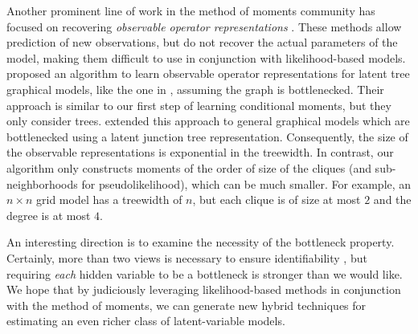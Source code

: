 
Another prominent line of work in the method of moments community has
  focused on recovering {\em observable operator
  representations} \citep{jaeger2000observable,hsu09spectral,bailly2010spectral,balle12automata}.
  These methods allow prediction of new observations, but do not
  recover the actual parameters of the model, making them difficult to use
  in conjunction with likelihood-based models. %
\citet{song2011spectral} proposed an algorithm to learn observable
  operator representations for latent tree graphical models, like the
  one in , assuming the graph is bottlenecked. 
Their approach is similar to our first step of learning conditional moments,
  but they only consider trees.
\citet{parikh12spectral} extended this approach to general graphical
  models which are bottlenecked using a latent junction tree representation. 
  Consequently, the size of the observable representations is exponential in
  the treewidth.
  In contrast, our algorithm only constructs moments of the order of size of the cliques
  (and sub-neighborhoods for pseudolikelihood), which can be much smaller.
For example, an $n\times n$ grid model has a treewidth of $n$, but each
  clique is of size at most $2$ and the degree is at most $4$.

An interesting direction is to examine the necessity of the bottleneck
property.  Certainly, more than two views is necessary to ensure
identifiability \cite{kruskal77three}, but requiring \emph{each} hidden variable to be
a bottleneck is stronger than we would like.  We hope that by judiciously
leveraging likelihood-based methods in conjunction with the method of moments,
we can generate new hybrid techniques for estimating
an even richer class of latent-variable models.
